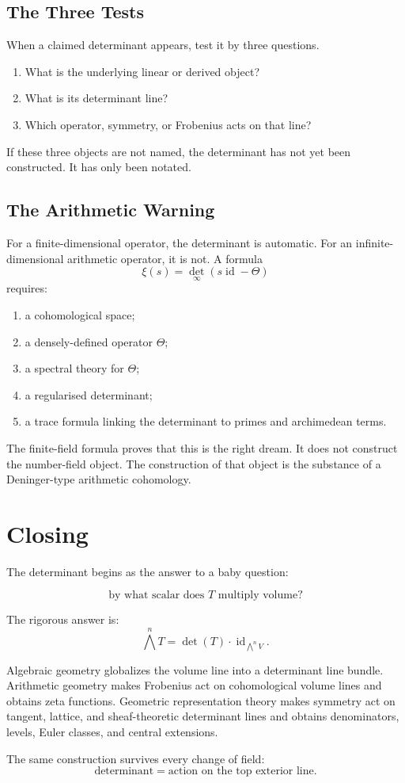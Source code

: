\documentclass[11pt]{memoir}
\newcommand{\id}{\operatorname{id}}
\begin{document}
\section{The Three Tests}
\label{sec:three-tests}

When a claimed determinant appears, test it by three questions.

\begin{enumerate}
\item What is the underlying linear or derived object?
\item What is its determinant line?
\item Which operator, symmetry, or Frobenius acts on that line?
\end{enumerate}

If these three objects are not named, the determinant has not yet been
constructed. It has only been notated.

\section{The Arithmetic Warning}
\label{sec:arithmetic-warning}

For a finite-dimensional operator, the determinant is automatic. For
an infinite-dimensional arithmetic operator, it is not. A formula
\[
  \xi(s)=\det_\infty(s\id-\Theta)
\]
requires:
\begin{enumerate}
\item a cohomological space;
\item a densely-defined operator \(\Theta\);
\item a spectral theory for \(\Theta\);
\item a regularised determinant;
\item a trace formula linking the determinant to primes and
archimedean terms.
\end{enumerate}

The finite-field formula proves that this is the right dream. It does
not construct the number-field object. The construction of that object
is the substance of a Deninger-type arithmetic cohomology.

\chapter*{Closing}

The determinant begins as the answer to a baby question:

\[
  \text{by what scalar does }T\text{ multiply volume?}
\]

The rigorous answer is:
\[
  \bigwedge^nT=\det(T)\cdot\id_{\bigwedge^nV}.
\]

Algebraic geometry globalizes the volume line into a determinant line
bundle. Arithmetic geometry makes Frobenius act on cohomological
volume lines and obtains zeta functions. Geometric representation
theory makes symmetry act on tangent, lattice, and sheaf-theoretic
determinant lines and obtains denominators, levels, Euler classes, and
central extensions.

The same construction survives every change of field:
\[
  \boxed{\text{determinant}=\text{action on the top exterior line}.}
\]
\end{document}
